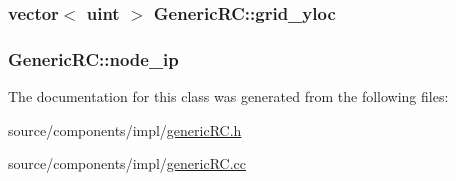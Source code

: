 \hypertarget{classGenericRC_89b5f8d2de4dc45ce64cbb0038ec0efa}{
\subsubsection[{grid\_\-yloc}]{\setlength{\rightskip}{0pt plus 5cm}vector$<$ {\bf uint} $>$ {\bf GenericRC::grid\_\-yloc}}}
\label{classGenericRC_89b5f8d2de4dc45ce64cbb0038ec0efa}


\hypertarget{classGenericRC_f937d0d5d2df92a5be2641fb062f312e}{
\subsubsection[{node\_\-ip}]{ {\bf GenericRC::node\_\-ip}}}
\label{classGenericRC_f937d0d5d2df92a5be2641fb062f312e}




The documentation for this class was generated from the following files:\begin{CompactItemize}
\item 
source/components/impl/\hyperlink{genericRC_8h}{genericRC.h}\item 
source/components/impl/\hyperlink{genericRC_8cc}{genericRC.cc}\end{CompactItemize}
